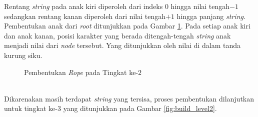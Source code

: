 Rentang \textit{string} pada anak kiri diperoleh dari indeks $0$ hingga nilai tengah$-1$ sedangkan rentang kanan diperoleh dari nilai tengah$+1$ hingga panjang \textit{string}. Pembentukan anak dari \textit{root} ditunjukkan pada Gambar \ref{fig:build_level1}. Pada setiap anak kiri dan anak kanan, posisi karakter yang berada ditengah-tengah \textit{string} anak menjadi nilai dari \textit{node} tersebut. Yang ditunjukkan oleh nilai di dalam tanda kurung siku.
\begin{figure}[h]
\centering
{}
\caption{Pembentukan \textit{Rope} pada Tingkat ke-$2$ \label{fig:build_level1}}
\end{figure}\\
Dikarenakan masih terdapat \textit{string} yang tersisa, proses pembentukan dilanjutkan untuk tingkat ke-$3$ yang ditunjukkan pada Gambar \ref{fig:build_level2}.
